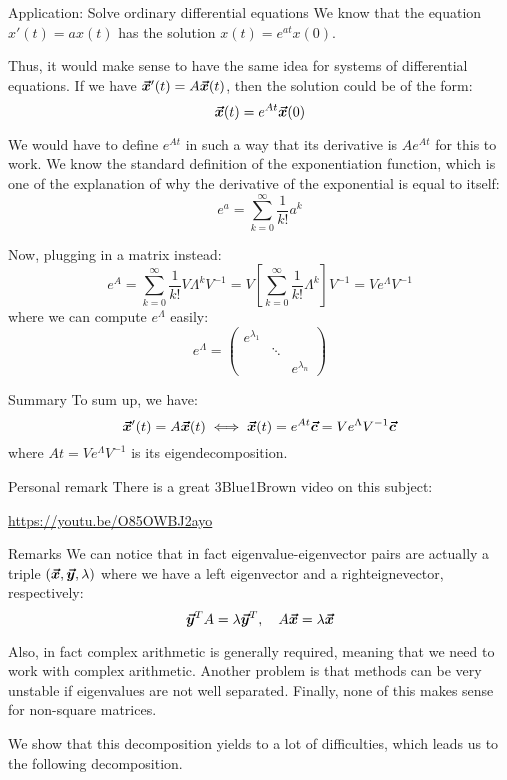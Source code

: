 \documentclass[a4paper]{article}
\begin{document}
\begin{parag}{Application: Solve ordinary differential equations}
    We know that the equation $x'\left(t\right) = ax\left(t\right)$ has the solution $x\left(t\right) = e^{at} x\left(0\right)$.

    Thus, it would make sense to have the same idea for systems of differential equations. If we have $\bvec{x}'\left(t\right) = A \bvec{x}\left(t\right)$, then the solution could be of the form: 
    \[\bvec{x}\left(t\right) = e^{A t} \bvec{x}\left(0\right)\]
    
    We would have to define $e^{At}$ in such a way that its derivative is $Ae^{At}$ for this to work. We know the standard definition of the exponentiation function, which is one of the explanation of why the derivative of the exponential is equal to itself: 
    \[e^a = \sum_{k=0}^{\infty} \frac{1}{k!} a^k\]
    
    Now, plugging in a matrix instead: 
    \[e^{A} = \sum_{k=0}^{\infty} \frac{1}{k!} V \Lambda^k V^{-1} = V \left[\sum_{k=0}^{\infty} \frac{1}{k!} \Lambda^k\right] V^{-1} = V e^{\Lambda} V^{-1}\]
    where we can compute $e^{\Lambda}$ easily: 
    \[e^{\Lambda} = \begin{pmatrix} e^{\lambda_1} &  &  \\  & \ddots &  \\  &  & e^{\lambda_n} \end{pmatrix} \]

    \begin{subparag}{Summary}
        To sum up, we have: 
        \[\bvec{x}'\left(t\right) = A \bvec{x}\left(t\right) \iff \bvec{x}\left(t\right) = e^{A t} \bvec{c} = V e^{\Lambda} V^{-1} \bvec{c}\]
        where $At = V e^{\Lambda} V^{-1}$ is its eigendecomposition.
    \end{subparag}
    
    \begin{subparag}{Personal remark}
        There is a great 3Blue1Brown video on this subject:
        \begin{center}
            \url{https://youtu.be/O85OWBJ2ayo}
        \end{center}
    \end{subparag}
\end{parag}


\begin{parag}{Remarks}
    We can notice that in fact eigenvalue-eigenvector pairs are actually a triple $\left(\bvec{x}, \bvec{y}, \lambda\right)$ where we have a left eigenvector and a righteignevector, respectively: 
    \[\bm{\protect\vec{y}}^T A = \lambda \bm{\protect\vec{y}}^T, \quad A \bm{\protect\vec{x}} = \lambda \bm{\protect\vec{x}}\]
    
    Also, in fact complex arithmetic is generally required, meaning that we need to work with complex arithmetic. Another problem is that methods can be very unstable if eigenvalues are not well separated. Finally, none of this makes sense for non-square matrices.

    We show that this decomposition yields to a lot of difficulties, which leads us to the following decomposition.
\end{parag}
\end{document}
